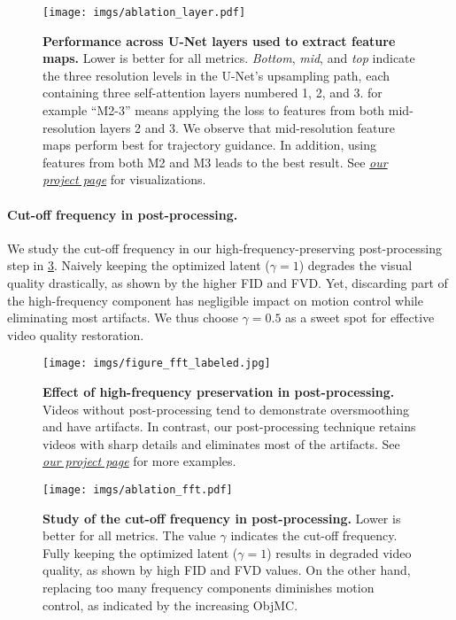 \documentclass{article} \usepackage{iclr2025_conference,times}
\begin{document}
\begin{figure}[!t]
\vspace{-8mm}
\centering
\texttt{[image: imgs/ablation\_layer.pdf]}
\caption{\textbf{Performance across U-Net layers used to extract feature maps.} Lower is better for all metrics.
\textit{Bottom}, \textit{mid}, and \textit{top} indicate the three resolution levels in the U-Net's upsampling path, each containing three self-attention layers numbered 1, 2, and 3.
for example ``M2-3'' means applying the loss to features from both mid-resolution layers 2 and 3.
We observe that mid-resolution feature maps perform best for trajectory guidance.
In addition, using features from both M2 and M3 leads to the best result.
See \href{https://kmcode1.github.io/Projects/SG-I2V\#ablation-unet-layer}{\textit{our project page}} for visualizations.}
\label{tab:results_layer}
\vspace{-3.0mm}
\end{figure}
\vspace{-2.0mm}
\paragraph{Cut-off frequency in post-processing.}
We study the cut-off frequency in our high-frequency-preserving post-processing step in \cref{tab:results_fft}.
Naively keeping the optimized latent ($\gamma = 1$) degrades the visual quality drastically, as shown by the higher FID and FVD.
Yet, discarding part of the high-frequency component has negligible impact on motion control while eliminating most artifacts.
We thus choose $\gamma = 0.5$ as a sweet spot for effective video quality restoration.
\begin{figure}[!t]
\centering
\texttt{[image: imgs/figure\_fft\_labeled.jpg]}
\vspace{1mm}
\caption{\textbf{Effect of high-frequency preservation in post-processing.}
Videos without post-processing tend to demonstrate oversmoothing and have artifacts.
In contrast, our post-processing technique retains videos with sharp details and eliminates most of the artifacts.
See \href{https://kmcode1.github.io/Projects/SG-I2V\#ablation-post-processing}{\textit{our project page}} for more examples.
}
\label{fig:results_fft}
\vspace{-8.0mm}
\end{figure}
\begin{figure}[!t]
\centering
\texttt{[image: imgs/ablation\_fft.pdf]}
\caption{\textbf{Study of the cut-off frequency in post-processing.}
Lower is better for all metrics.
The value $\gamma$ indicates the cut-off frequency. 
Fully keeping the optimized latent ($\gamma = 1$) results in degraded video quality, as shown by high FID and FVD values.
On the other hand, replacing too many frequency components diminishes motion control, as indicated by the increasing ObjMC.
}
\label{tab:results_fft}
\vspace{-3.0mm}
\end{figure}
\end{document}
